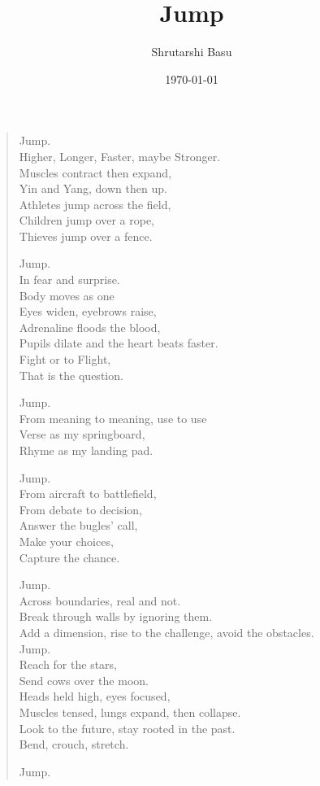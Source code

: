 \documentclass[11pt,letterpaper]{article}
\title{Jump}
\author{Shrutarshi Basu}
\date{\today}
\begin{document}
\maketitle
\begin{verse}

Jump. \\
Higher, Longer, Faster, maybe Stronger. \\
Muscles contract then expand, \\
Yin and Yang, down then up. \\
Athletes jump across the field, \\
Children jump over a rope, \\
Thieves jump over a fence. 

Jump. \\
In fear and surprise.\\
Body moves as one \\
Eyes widen, eyebrows raise, \\
Adrenaline floods the blood, \\
Pupils dilate and the heart beats faster. \\
Fight or to Flight, \\
That is the question.

Jump.\\
From meaning to meaning, use to use\\
Verse as my springboard,\\
Rhyme as my landing pad.

Jump.\\
From aircraft to battlefield,\\
From debate to decision,\\
Answer the bugles' call,\\
Make your choices,\\
Capture the chance.

Jump.\\
Across boundaries, real and not.\\
Break through walls by ignoring them.\\
Add a dimension, rise to the challenge, avoid the obstacles.\\

Jump.\\
Reach for the stars,\\
Send cows over the moon.\\
Heads held high, eyes focused,\\
Muscles tensed, lungs expand, then collapse.\\
Look to the future, stay rooted in the past.\\
Bend, crouch, stretch. 

Jump.\\
\end{verse}

\end{document}
